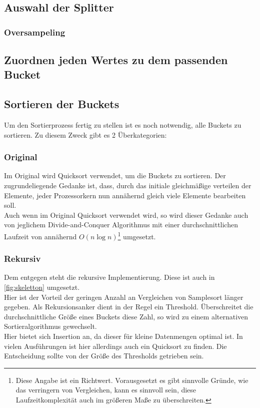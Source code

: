 	\subsection{Auswahl der Splitter}
		
	\subsubsection{Oversampeling}


	\subsection{Zuordnen jeden Wertes zu dem passenden Bucket}

	\subsection{Sortieren der Buckets}
		Um den Sortierprozess fertig zu stellen ist es noch notwendig, alle Buckets zu sortieren.
		Zu diesem Zweck gibt es 2 Überkategorien:
		\subsubsection{Original}
			Im Original \autocite{frazer-1970} wird Quicksort verwendet, um die Buckets zu sortieren.
			Der zugrundeliegende Gedanke ist, dass, durch das initiale gleichmäßige verteilen der Elemente, jeder Prozessorkern nun annähernd gleich viele Elemente bearbeiten soll.\\
			Auch wenn im Original Quicksort verwendet wird, so wird dieser Gedanke auch von jeglichem Divide-and-Conquer Algorithmus mit einer durchschnittlichen Laufzeit von annähernd $O(n\log{n})$\footnote{Diese Angabe ist ein Richtwert. Vorausgesetzt es gibt sinnvolle Gründe, wie das verringern von Vergleichen, kann es sinnvoll sein, diese Laufzeitkomplexität auch im größeren Maße zu überschreiten.} umgesetzt. 
		\subsubsection{Rekursiv}
			Dem entgegen steht die rekursive Implementierung.
			Diese ist auch in \ref{fig:skeletton} umgesetzt.\\
			Hier ist der Vorteil der geringen Anzahl an Vergleichen von Samplesort länger gegeben. Als Rekursionsanker dient in der Regel ein Threshold.
			Überschreitet die durchschnittliche Größe eines Buckets diese Zahl, so wird zu einem alternativen Sortieralgorithmus gewechselt. \\
			Hier bietet sich Insertion an, da dieser für kleine Datenmengen optimal ist. \autocite{geeksforgeeks-2021} 
			In vielen Ausführungen ist hier allerdings auch ein Quicksort zu finden.
			Die Entscheidung sollte von der Größe des Thresholds getrieben sein.
			

